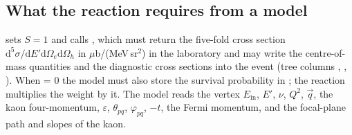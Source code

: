 \documentclass{simcnote}
\begin{document}
\subsection{What the reaction requires from a model}
 sets $S=1$ and calls , which must return the
five-fold cross section $\mathrm{d}^5\sigma/\mathrm{d}E'\mathrm{d}\Omega_e\mathrm{d}\Omega_h$ in $\mu$b/(MeV\,sr$^2$)
in the laboratory and may write the centre-of-mass quantities and the diagnostic cross sections into the event
(tree columns , , ). When  = 0 the model must also store the
survival probability in ; the reaction multiplies the weight by it. The model reads the vertex
$E_\mathrm{in}$, $E'$, $\nu$, $Q^2$, $\vec q$, the kaon four-momentum, $\varepsilon$, $\theta_{pq}$, $\varphi_{pq}$,
$-t$, the Fermi momentum, and the focal-plane path and slopes of the kaon.
\end{document}
